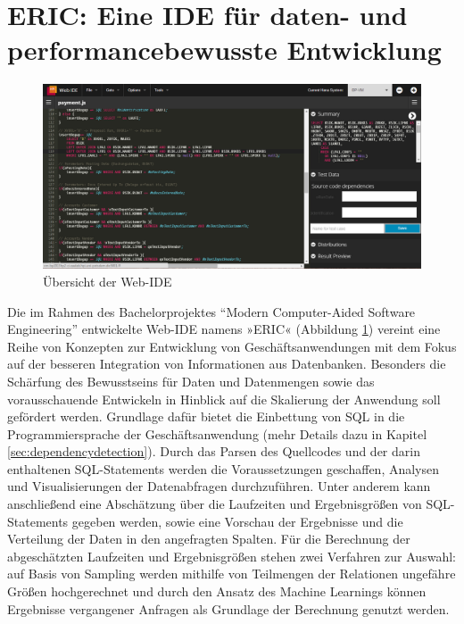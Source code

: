 \section{ERIC: Eine IDE f{\"u}r daten- und performancebewusste Entwicklung}\label{chap:entwicklungsumgebung}

%
%

\begin{figure}[ht]
	\centering
  \includegraphics[width=1\textwidth]{figures/ide.png}
	\caption{Übersicht der Web-IDE}
	\label{fig:ide}
\end{figure}

Die im Rahmen des Bachelorprojektes ``Modern Computer-Aided Software Engineering'' entwickelte Web-IDE namens »ERIC« (Abbildung \ref{fig:ide}) vereint eine Reihe von Konzepten zur Entwicklung von Geschäftsanwendungen mit dem Fokus auf der besseren Integration von Informationen aus Datenbanken.
Besonders die Schärfung des Bewusstseins für Daten und Datenmengen sowie das vorausschauende Entwickeln in Hinblick auf die Skalierung der Anwendung soll gefördert werden.
Grundlage dafür bietet die Einbettung von SQL in die Programmiersprache der Geschäftsanwendung \cite{Horschig2014} (mehr Details dazu in Kapitel \ref{sec:dependencydetection}).
Durch das Parsen des Quellcodes \cite{Horschig2014} und der darin enthaltenen SQL-Statements \cite{Schulz2014} werden die Voraussetzungen geschaffen, Analysen und Visualisierungen der Datenabfragen durchzuführen.
Unter anderem kann anschließend eine Abschätzung über die Laufzeiten und Ergebnisgrößen von SQL-Statements gegeben werden, sowie eine Vorschau der Ergebnisse und die Verteilung der Daten in den angefragten Spalten.
Für die Berechnung der abgeschätzten Laufzeiten und Ergebnisgrößen stehen zwei Verfahren zur Auswahl: auf Basis von Sampling \cite{Exner2014} werden mithilfe von Teilmengen der Relationen ungefähre Größen hochgerechnet und durch den Ansatz des Machine Learnings \cite{Mues2014} können Ergebnisse vergangener Anfragen als Grundlage der Berechnung genutzt werden.

